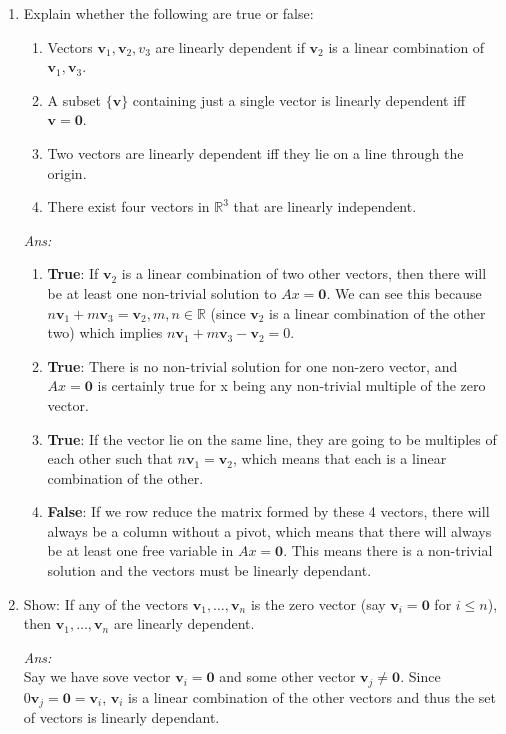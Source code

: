 \documentclass[12pt]{amsart}
\newcommand{\bo}{\mathbf{0}}
\newcommand{\bv}{\mathbf v}
\newcommand{\R}{\mathbb{R}}
\newcommand\sol[1]{
\medskip
\begin{mdframed}
\emph{Ans:\\} #1
\end{mdframed}
\medskip
}
\begin{document}
\begin{enumerate}
\item Explain whether the following are true or false: %
\begin{enumerate}
\item   
 Vectors $\bv_1,\bv_2, v_3$ are linearly dependent if $\bv_2$ is a linear combination of $\bv_1,\bv_3$.
\item
 A subset $\{ \bv \}$ containing just a single vector is linearly dependent iff $\bv=\bo$.
\item
 Two vectors are linearly dependent iff they lie on a line through the origin.  
\item
 There exist four vectors in $\R^3$ that are linearly independent.
\end{enumerate}


\sol{
  \begin{enumerate}
    \item \textbf{True}: If $\bv_2$ is a linear combination of two other vectors, then there will be at least one non-trivial solution to $Ax=\bo$. We can see this because $n\bv_1+m\bv_3=\bv_2, m,n\in\R$ (since $\bv_2$ is a linear combination of the other two) which implies $n\bv_1+m\bv_3-\bv_2=0$.
    \item \textbf{True}: There is no non-trivial solution for one non-zero vector, and $Ax=\bo$ is certainly true for x being any non-trivial multiple of the zero vector.
    \item \textbf{True}: If the vector lie on the same line, they are going to be multiples of each other such that $n\bv_1=\bv_2$, which means that each is a linear combination of the other.
    \item \textbf{False}: If we row reduce the matrix formed by these 4 vectors, there will always be a column without a pivot, which means that there will always be at least one free variable in $Ax=\bo$. This means there is a non-trivial solution and the vectors must be linearly dependant.
  \end{enumerate}
}


\item Show: If any of the vectors $\bv_1,\dots,\bv_n$ is the zero vector (say $\bv_i=\bo$ for $i\leq n$), then
 $\bv_1,\dots,\bv_n$ are linearly dependent.

 \sol{
  Say we have sove vector $\bv_i=\bo$ and some other vector $\bv_j\ne\bo$. Since $0\bv_j=\bo=\bv_i$, $\bv_i$ is a linear combination of the other vectors and thus the set of vectors is linearly dependant.
 }


\end{enumerate}
\end{document}
